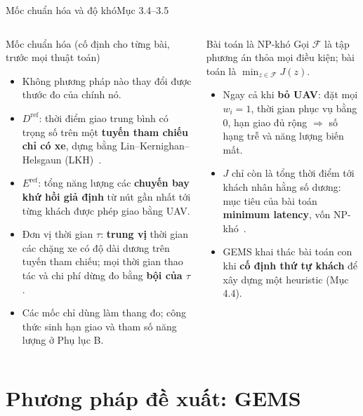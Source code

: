 \documentclass[aspectratio=169,10pt,t,xcolor={table}]{beamer}
\newcommand{\Dref}{D^{\mathrm{ref}}}
\newcommand{\Eref}{E^{\mathrm{ref}}}
\newcommand{\src}[1]{\hfill{\normalfont\footnotesize\color{white!62!navy}#1}}  %
\begin{document}
\begin{frame}{Mốc chuẩn hóa và độ khó\src{Mục 3.4--3.5}}
\begin{columns}[T,onlytextwidth]
\begin{block}{Mốc chuẩn hóa (cố định cho từng bài, trước mọi thuật toán)}
\footnotesize
\begin{itemize}
\item Không phương pháp nào thay đổi được thước đo của chính nó.
\item $\Dref$: thời điểm giao trung bình có trọng số trên một \textbf{tuyến tham chiếu chỉ có xe}, dựng bằng Lin--Kernighan--Helsgaun (LKH)~\cite{lkh2000}.
\item $\Eref$: tổng năng lượng các \textbf{chuyến bay khứ hồi giả định} từ nút gần nhất tới từng khách được phép giao bằng UAV.
\item Đơn vị thời gian $\tau$: \textbf{trung vị} thời gian các chặng xe có độ dài dương trên tuyến tham chiếu; mọi thời gian thao tác và chi phí dừng đo bằng \textbf{bội của $\tau$}.
\item Các mốc chỉ dùng làm thang đo; công thức sinh hạn giao và tham số năng lượng ở Phụ lục B.
\end{itemize}
\end{block}
\begin{alertblock}{Bài toán là NP-khó}
\footnotesize
Gọi $\mathcal F$ là tập phương án thỏa mọi điều kiện; bài toán là $\min_{z\in\mathcal F}J(z)$.
\begin{itemize}
\item Ngay cả khi \textbf{bỏ UAV}: đặt mọi $w_i=1$, thời gian phục vụ bằng 0, hạn giao đủ rộng $\Rightarrow$ số hạng trễ và năng lượng biến mất.
\item $J$ chỉ còn là tổng thời điểm tới khách nhân hằng số dương: mục tiêu của bài toán \textbf{minimum latency}, vốn NP-khó~\cite{blum1994}.
\item GEMS khai thác bài toán con khi \textbf{cố định thứ tự khách} để xây dựng một heuristic (Mục 4.4).
\end{itemize}
\end{alertblock}
\end{columns}
\end{frame}
\section{Phương pháp đề xuất: GEMS}
\end{document}
